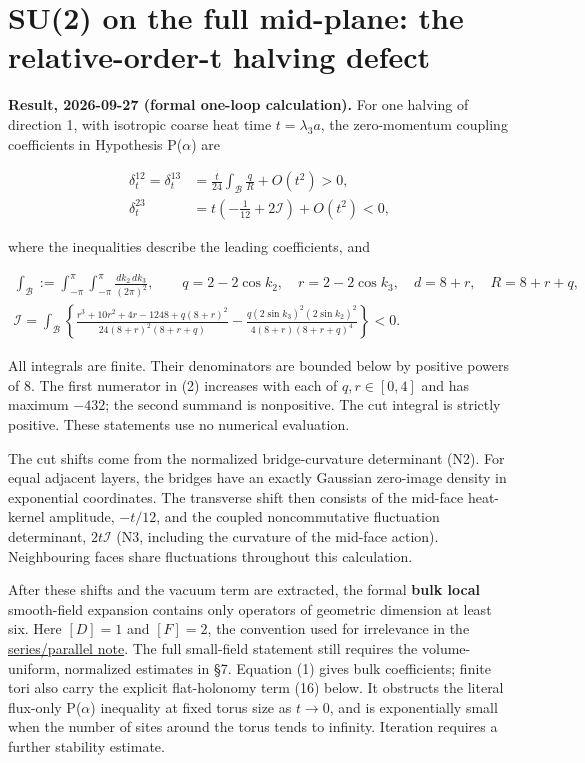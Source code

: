\documentclass[11pt,a4paper]{article}
\begin{document}
\hypertarget{su2-on-the-full-mid-plane-the-relative-order-t-halving-defect}{%
\section{SU(2) on the full mid-plane: the relative-order-t halving
defect}\label{su2-on-the-full-mid-plane-the-relative-order-t-halving-defect}}

\textbf{Result, 2026-09-27 (formal one-loop calculation).} For one
halving of direction 1, with isotropic coarse heat time
\(t=\lambda_3a\), the zero-momentum coupling coefficients in Hypothesis
P(\(\alpha\)) are

\[\boxed{\begin{aligned}
\delta_t^{12}=\delta_t^{13}
 &=\frac{t}{24}\int_{\mathcal B}\frac{q}{R}+O(t^2)>0,\\
\delta_t^{23}
 &=t\left(-\frac1{12}+2\mathcal I\right)+O(t^2)<0,
\end{aligned}}\tag{1}\]

where the inequalities describe the leading coefficients, and

\[\begin{gathered}
\int_{\mathcal B}:=\int_{-\pi}^{\pi}\int_{-\pi}^{\pi}
 \frac{dk_2\,dk_3}{(2\pi)^2},\qquad
q=2-2\cos k_2,\quad r=2-2\cos k_3,\quad d=8+r,\quad R=8+r+q,\\
\boxed{\displaystyle
\mathcal I=\int_{\mathcal B}
\left\{\frac{r^3+10r^2+4r-1248+q(8+r)^2}{24(8+r)^2(8+r+q)}
-\frac{q(2\sin k_3)^2(2\sin k_2)^2}
 {4(8+r)(8+r+q)^4}\right\}<0.}
\end{gathered}\tag{2}\]

All integrals are finite. Their denominators are bounded below by
positive powers of 8. The first numerator in (2) increases with each of
\(q,r\in[0,4]\) and has maximum \(-432\); the second summand is
nonpositive. The cut integral is strictly positive. These statements use
no numerical evaluation.

The cut shifts come from the normalized bridge-curvature determinant
(N2). For equal adjacent layers, the bridges have an exactly Gaussian
zero-image density in exponential coordinates. The transverse shift then
consists of the mid-face heat-kernel amplitude, \(-t/12\), and the
coupled noncommutative fluctuation determinant, \(2t\mathcal I\) (N3,
including the curvature of the mid-face action). Neighbouring faces
share fluctuations throughout this calculation.

After these shifts and the vacuum term are extracted, the formal
\textbf{bulk local} smooth-field expansion contains only operators of
geometric dimension at least six. Here \([D]=1\) and \([F]=2\), the
convention used for irrelevance in the
\href{series-parallel-gauge-refinement.md}{series/parallel note}. The
full small-field statement still requires the volume-uniform, normalized
estimates in §7. Equation (1) gives bulk coefficients; finite tori also
carry the explicit flat-holonomy term (16) below. It obstructs the
literal flux-only P(\(\alpha\)) inequality at fixed torus size as
\(t\to0\), and is exponentially small when the number of sites around
the torus tends to infinity. Iteration requires a further stability
estimate.
\end{document}
